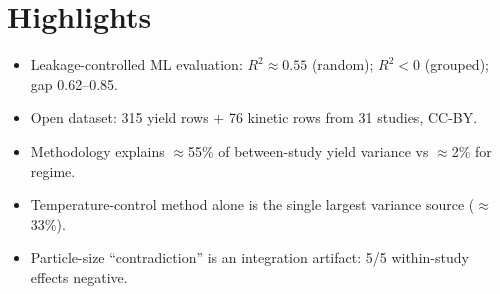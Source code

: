 \documentclass[preprint,12pt]{elsarticle}
\begin{document}
\section*{Highlights}
\begin{itemize}\setlength{\itemsep}{0pt}
  \item Leakage-controlled ML evaluation: $R^2\!\approx\!0.55$ (random); $R^2\!<\!0$ (grouped); gap 0.62--0.85.
  \item Open dataset: 315 yield rows + 76 kinetic rows from 31 studies, CC-BY.
  \item Methodology explains $\approx$55\% of between-study yield variance vs $\approx$2\% for regime.
  \item Temperature-control method alone is the single largest variance source ($\approx$33\%).
  \item Particle-size ``contradiction'' is an integration artifact: 5/5 within-study effects negative.
\end{itemize}












\end{document}

